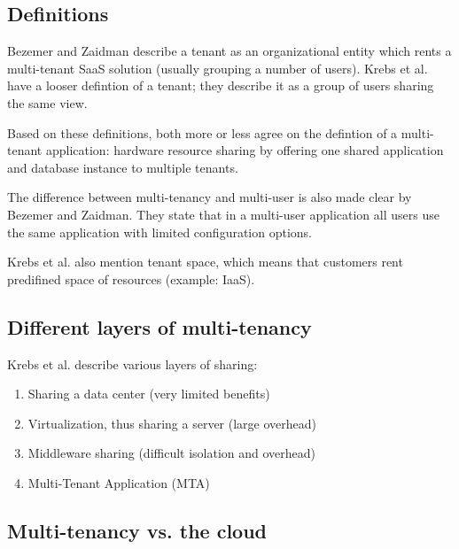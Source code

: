 
\subsection{Definitions}

Bezemer and Zaidman\cite{bezemer2010multi} describe a tenant as an organizational entity which rents a multi-tenant SaaS solution (usually grouping a number of users). Krebs et al.\cite{krebs2012architecture} have a looser defintion of a tenant; they describe it as a group of users sharing the same view.

Based on these definitions, both more or less agree on the defintion of a multi-tenant application: hardware resource sharing by offering one shared application and database instance to multiple tenants.

The difference between multi-tenancy and multi-user is also made clear by Bezemer and Zaidman. They state that in a multi-user application all users use the same application with limited configuration options. %

Krebs et al. also mention tenant space, which means that customers rent predifined space of resources (example: IaaS).

\subsection{Different layers of multi-tenancy}



Krebs et al.\cite{krebs2012architecture} describe various layers of sharing:

\begin{enumerate}
\item Sharing a data center (very limited benefits)
\item Virtualization, thus sharing a server (large overhead)
\item Middleware sharing (difficult isolation and overhead)
\item Multi-Tenant Application (MTA)
\end{enumerate}


\subsection{Multi-tenancy vs. the cloud}

